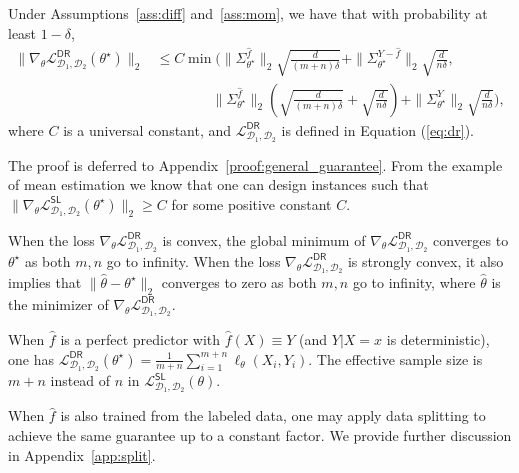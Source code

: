 \begin{theorem}\label{thm:general} Under Assumptions~\ref{ass:diff} and~\ref{ass:mom}, we have that with probability at least $1-\delta$,
\begin{align*}
  \| \nabla_\theta \mathcal{L}^{\mathsf{DR}}_{\mathcal{D}_1,\mathcal{D}_2}(\theta^\star) \|_2 & \leq C   \min\Bigg(\|\Sigma_{\theta^\star}^{\hat f}\|_2\sqrt{\frac{d}{(m+n) \delta}} + \|\Sigma_{\theta^\star}^{Y-\hat f}\|_2\sqrt{\frac{d}{n \delta}},  \\ 
  &  \qquad \qquad \|\Sigma_{\theta^\star}^{\hat f}\|_2\left(\sqrt{\frac{d}{(m+n) \delta}} + \sqrt{\frac{d}{n\delta}} \right) + \|\Sigma_{\theta^\star}^{Y}\|_2\sqrt{\frac{d}{n \delta}}\Bigg),
\end{align*} 
where $C$ is a universal constant, and $\mathcal{L}^{\mathsf{DR}}_{\mathcal{D}_1,\mathcal{D}_2}$ is defined in Equation (\ref{eq:dr}).
\end{theorem}

The proof is deferred to Appendix~\ref{proof:general_guarantee}. From the example of mean estimation we know that one can design instances such that $   \| \nabla_\theta \mathcal{L}^{\mathsf{SL}}_{\mathcal{D}_1,\mathcal{D}_2}(\theta^\star) \|_2  \geq C$ for some positive constant $C$. 

When the loss $\nabla_\theta \mathcal{L}^{\mathsf{DR}}_{\mathcal{D}_1,\mathcal{D}_2}$ is convex, the global minimum of $\nabla_\theta \mathcal{L}^{\mathsf{DR}}_{\mathcal{D}_1,\mathcal{D}_2}$ converges to $\theta^\star$ as both $m, n$ go to infinity. When the loss $\nabla_\theta \mathcal{L}^{\mathsf{DR}}_{\mathcal{D}_1,\mathcal{D}_2}$ is strongly convex, it also implies that  $\|\hat \theta-\theta^\star\|_2$ converges to  zero as both $m, n$ go to infinity, where $\hat \theta$ is the minimizer of $\nabla_\theta \mathcal{L}^{\mathsf{DR}}_{\mathcal{D}_1,\mathcal{D}_2}$.

When $\hat f$ is a perfect predictor with $\hat f(X) \equiv Y$ (and $Y|X=x$ is deterministic), one has  $ 
\mathcal{L}^{\mathsf{DR}}_{\mathcal{D}_1,\mathcal{D}_2}(\theta^\star) = \frac{1}{m+n}  \sum_{i=1}^{m+n} \ell_\theta(X_i, Y_i)$. The effective sample size is $m+n$ instead of $n$ in $\mathcal{L}^{\mathsf{SL}}_{\mathcal{D}_1,\mathcal{D}_2}(\theta)$.

When $\hat f$ is also trained from the labeled data, one may apply data splitting to achieve the same guarantee up to a constant factor. We provide further discussion in Appendix~\ref{app:split}.

